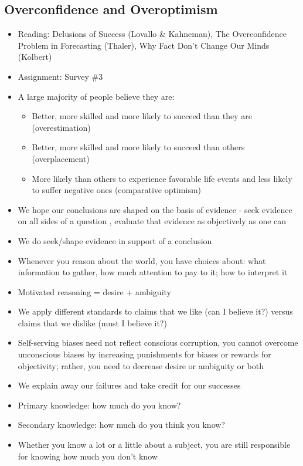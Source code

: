 \documentclass[12pt]{article}
\begin{document}
\subsection{Overconfidence and Overoptimism}
\begin{itemize}
\item Reading: Delusions of Success (Lovallo \& Kahneman), The Overconfidence Problem in Forecasting (Thaler), Why Fact Don't Change Our Minds (Kolbert)
\item Assignment: Survey \#3
\item A large majority of people believe they are: \begin{itemize} 
\item Better, more skilled and more likely to succeed than they are (overestimation) 
\item Better, more skilled and more likely to succeed than others (overplacement) 
\item More likely than others to experience favorable life events and less likely to suffer negative ones (comparative optimism) \end{itemize} 
\item We hope our conclusions are shaped on the basis of evidence - seek evidence on all sides of a question , evaluate that evidence as objectively as one can 
\item We do seek/shape evidence in support of a conclusion 
\item Whenever you reason about the world, you have choices about: what information to gather, how much attention to pay to it; how to interpret it
\item Motivated reasoning = desire + ambiguity 
\item We apply different standards to claims that we like (can I believe it?) versus claims that we dislike (must I believe it?) 
\item Self-serving biases need not reflect conscious corruption, you cannot overcome unconscious biases by increasing punishments for biases or rewards for objectivity; rather, you need to decrease desire or ambiguity or both 
\item We explain away our failures and take credit for our successes 
\item Primary knowledge: how much do you know? 
\item Secondary knowledge: how much do you think you know? 
\item Whether you know a lot or a little about a subject, you are still responsible for knowing how much you don't know 

\end{itemize}
\end{document}
